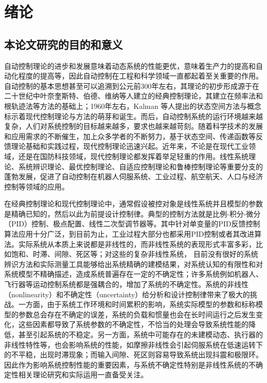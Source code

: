 \chapter{绪论}\label{chap:intro}
\section{本论文研究的目的和意义}\label{sect:1.1}

自动控制理论的进步和发展意味着动态系统的性能更优，意味着生产力的提高和自动化程度的提高等，因此自动控制在工程和科学领域一直都起着至关重要的作用。自动控制的基本思想甚至可以追溯到公元前300年左右，其理论的初步形成源于在二十世纪中叶奈奎斯特、伯德、维纳等人建立的经典控制理论，其建立在频率法和根轨迹法等方法的基础上；1960年左右，Kalman 等人提出的状态空间方法与概念标示着现代控制理论与方法的萌芽和诞生。而后，自动控制系统的运行环境越来越复杂，人们对系统控制的目标越来越多，要求也越来越苛刻。随着科学技术的发展和应用需求的不断催生，加上众多学者的不断努力，基于状态空间、传递函数等反馈理论基础和实践过程，现代控制理论迅速兴起。近年来，不论是在现代工业领域，还是在国防科技领域，现代控制理论都发挥着举足轻重的作用。线性系统理论、系统辨识理论、最优控制理论、自适应控制理论和鲁棒控制理论等重要分支的蓬勃发展，促进了自动控制在机器人伺服系统、工业过程、航空航天、人口与经济控制等领域的应用。

在经典控制理论和现代控制理论中，通常假设被控对象是线性系统并且模型的参数是精确已知的，然后以此为前提设计控制律。典型的控制方法就是比例-积分-微分（PID）控制、极点配置、线性二次型调节器等。其中针对单变量的PID反馈控制算法应用十分广泛，到目前为止，工业过程大部分也都采用PID控制或者其改进算法。实际系统从本质上来说都是非线性的，而非线性系统的表现形式丰富多彩，比如饱和、时滞、间隙、死区等；对这些的复杂非线性系统， 目前没有很好的系统辨识方法和实际测量工具能够给出系统精确的建模结果，对系统认知的有限性和对系统模型不精确描述，造成系统普遍存在一定的不确定性；许多系统例如机器人、飞行器等运动控制系统都是强耦合的，增加了系统的不确定性。系统的非线性（nonlinearity）和不确定性（uncertainty）给分析和设计控制律带来了极大的挑战。一方面，由于系统工作环境和时间累积的影响，系统实际模型的参数和标称模型的参数总会存在不确定的误差，系统的负载和惯量也会在长时间运行之后发生变化，这些因素都导致了系统参数的不确定性，不恰当的处理会导致系统性能的降低，甚至引起系统的不稳定。另一方面，系统中可能存在的未建模动态、执行器的非线性特性等，也会影响系统的性能，如摩擦非线性会引起伺服系统在低速运转下的不平稳，出现时滞现象；而输入间隙、死区则容易导致系统出现抖震和极限环。因此作为影响系统控制性能的重要因素，与系统不确定性特别是非线性系统的不确定性相关理论研究和实际运用一直备受关注。

